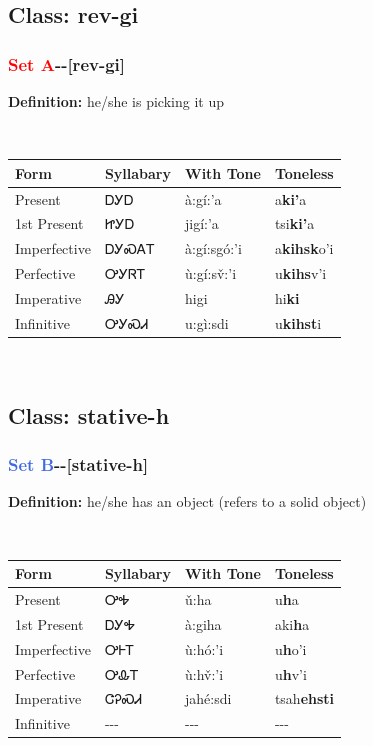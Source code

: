 \subsection*{Class: rev-gi}
\nopagebreak
\needspace{2in}
\subsubsection*{\textcolor{Red}{Set A}{-}\textbf{}{-}[rev-gi]}
\nopagebreak
\textbf{Definition: } he/she is picking it up
\\[0.5em]
\begin{tabularx}{\textwidth}{l X X X}%
\toprule%
\textbf{Form}&\textbf{Syllabary}&\textbf{With Tone}&\textbf{Toneless}\\%
\midrule%
Present&ᎠᎩᎠ&à:gí:’a&a\textbf{ki'}a\\%
1st Present&ᏥᎩᎠ&jigí:’a&tsi\textbf{ki'}a\\%
Imperfective&ᎠᎩᏍᎪᎢ&à:gí:sgó:’i&a\textbf{kihsk}o'i\\%
Perfective&ᎤᎩᏒᎢ&ù:gí:sv̌:’i&u\textbf{kihs}v'i\\%
Imperative&ᎯᎩ&higi&hi\textbf{ki}\\%
Infinitive&ᎤᎩᏍᏗ&u:gì:sdi&u\textbf{kihst}i\\%
\bottomrule%
\end{tabularx}
\\[1em]
\needspace{3in}
\subsection*{Class: stative-h}
\nopagebreak
\needspace{2in}
\subsubsection*{\textcolor{RoyalBlue}{Set B}{-}\textbf{}{-}[stative-h]}
\nopagebreak
\textbf{Definition: } he/she has an object (refers to a solid object)
\\[0.5em]
\begin{tabularx}{\textwidth}{l X X X}%
\toprule%
\textbf{Form}&\textbf{Syllabary}&\textbf{With Tone}&\textbf{Toneless}\\%
\midrule%
Present&ᎤᎭ&ǔ:ha&u\textbf{h}a\\%
1st Present&ᎠᎩᎭ&à:giha&aki\textbf{h}a\\%
Imperfective&ᎤᎰᎢ&ù:hó:’i&u\textbf{h}o'i\\%
Perfective&ᎤᎲᎢ&ù:hv̌:’i&u\textbf{h}v'i\\%
Imperative&ᏣᎮᏍᏗ&jahé:sdi&tsah\textbf{ehsti}\\%
Infinitive&{-}{-}{-}&{-}{-}{-}&{-}{-}{-}\\%
\bottomrule%
\end{tabularx}
\\[1em]